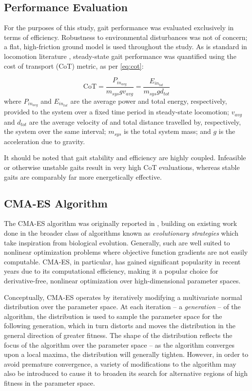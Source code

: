 \documentclass[conference,11pt,letterpaper]{IEEEtran}
\begin{document}
\subsection{Performance Evaluation} \label{sec:performance}

For the purposes of this study, gait performance was evaluated exclusively in terms of efficiency. Robustness to environmental disturbances was not of concern; a flat, high-friction ground model is used throughout the study. As is standard in locomotion literature \autocite{von1950price}, steady-state gait performance was quantified using the cost of transport (CoT) metric, as per \cref{eq:cot}:

    \begin{equation} \label{eq:cot}
        \text{CoT} = \frac{P_{in_{avg}}}{m_{sys}gv_{avg}} = \frac{E_{in_{tot}}}{m_{sys}gd_{tot}}
    \end{equation}
where $P_{in_{avg}}$ and $E_{in_{tot}}$ are the average power and total energy, respectively, provided to the system over a fixed time period in steady-state locomotion; $v_{avg}$ and $d_{tot}$ are the average velocity of and total distance travelled by, respectively, the system over the same interval; $m_{sys}$ is the total system mass; and $g$ is the acceleration due to gravity.

It should be noted that gait stability and efficiency are highly coupled. Infeasible or otherwise unstable gaits result in very high CoT evaluations, whereas stable gaits are comparably far more energetically effective.

\subsection{CMA-ES Algorithm} \label{sec:cmaes}

	The CMA-ES algorithm was originally reported in \autocite{hansen2001}, building on existing work done in the broader class of algorithms known as \emph{evolutionary strategies} which take inspiration from biological evolution. Generally, such are well suited to nonlinear optimization problems where objective function gradients are not easily computable. CMA-ES, in particular, has gained significant popularity in recent years due to its computational efficiency, making it a popular choice for derivative-free, nonlinear optimization over high-dimensional parameter spaces. 
	
	Conceptually, CMA-ES operates by iteratively modifying a multivariate normal distribution over the parameter space. At each iteration -- a \emph{generation} -- of the algorithm, the distribution is used to sample the parameter space for the following generation, which in turn distorts and moves the distribution in the general direction of greater fitness. The shape of the distribution reflects the focus of the algorithm over the parameter space -- as the algorithm converges upon a local maxima, the distribution will generally tighten. However, in order to avoid premature convergence, a variety of modifications to the algorithm may also be introduced to cause it to broaden its search for alternative regions of high fitness in the parameter space.
	
\end{document}
